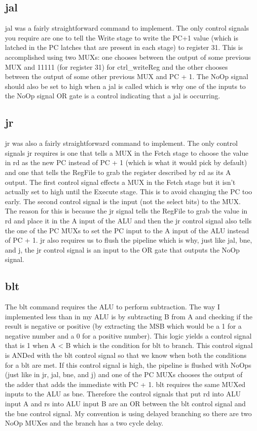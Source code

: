 \documentclass[letterpaper]{article} %
\begin{document}
    \subsection{jal}
        jal was a fairly straightforward command to implement. The only control signals you require are one to tell the Write stage to write the PC+1 value (which is latched in the PC latches that are present in each stage) to register 31. This is accomplished using two MUXs: one chooses between the output of some previous MUX and 11111 (for register 31) for ctrl\_writeReg and the other chooses between the output of some other previous MUX and PC + 1. 
        The NoOp signal should also be set to high when a jal is called which is why one of the inputs to the NoOp signal OR gate is a control indicating that a jal is occurring. 
        
    \subsection{jr}
        jr was also a fairly straightforward command to implement. The only control signals jr requires is one that tells a MUX in the Fetch stage to choose the value in rd as the new PC instead of PC + 1 (which is what it would pick by default) and one that tells the RegFile to grab the register described by rd as its A output. The first control signal effects a MUX in the Fetch stage but it isn't actually set to high until the Execute stage. This is to avoid changing the PC too early. The second control signal is the input (not the select bits) to the MUX. The reason for this is because the jr signal tells the RegFile to grab the value in rd and place it in the A input of the ALU and then the jr control signal also tells the one of the PC MUXs to set the PC input to the A input of the ALU instead of PC + 1. jr also requires us to flush the pipeline which is why, just like jal, bne, and j, the jr control signal is an input to the OR gate that outputs the NoOp signal. 
        
    
    \subsection{blt}
        The blt command requires the ALU to perform subtraction. The way I implemented less than in my ALU is by subtracting B from A and checking if the result is negative or positive (by extracting the MSB which would be a 1 for a negative number and a 0 for a positive number). This logic yields a control signal that is 1 when A < B which is the condition for blt to branch. This control signal is ANDed with the blt control signal so that we know when both the conditions for a blt are met. If this control signal is high, the pipeline is flushed with NoOps (just like in jr, jal, bne, and j) and one of the PC MUXs chooses the output of the adder that adds the immediate with PC + 1. blt requires the same MUXed inputs to the ALU as bne. Therefore the control signals that put rd into ALU input A and rs into ALU input B are an OR between the blt control signal and the bne control signal. My convention is using delayed branching so there are two NoOp MUXes and the branch has a two cycle delay.
    
\end{document}
